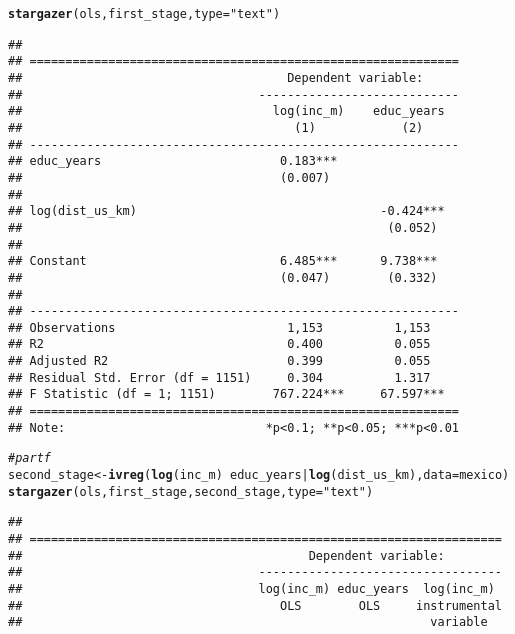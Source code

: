 \documentclass{article}\usepackage[]{graphicx}\usepackage[]{xcolor}
\makeatletter
\newcommand{\hlstr}[1]{\textcolor[rgb]{0.192,0.494,0.8}{#1}}%
\newcommand{\hlcom}[1]{\textcolor[rgb]{0.678,0.584,0.686}{\textit{#1}}}%
\newcommand{\hlopt}[1]{\textcolor[rgb]{0,0,0}{#1}}%
\newcommand{\hlstd}[1]{\textcolor[rgb]{0.345,0.345,0.345}{#1}}%
\newcommand{\hlkwb}[1]{\textcolor[rgb]{0.69,0.353,0.396}{#1}}%
\newcommand{\hlkwc}[1]{\textcolor[rgb]{0.333,0.667,0.333}{#1}}%
\newcommand{\hlkwd}[1]{\textcolor[rgb]{0.737,0.353,0.396}{\textbf{#1}}}%
\newenvironment{kframe}{%
 \def\at@end@of@kframe{}%
 \ifinner\ifhmode%
  \def\at@end@of@kframe{\end{minipage}}%
  \begin{minipage}{\columnwidth}%
 \fi\fi%
 \def\FrameCommand##1{\hskip\@totalleftmargin \hskip-\fboxsep
 \colorbox{shadecolor}{##1}\hskip-\fboxsep
     \hskip-\linewidth \hskip-\@totalleftmargin \hskip\columnwidth}%
 \MakeFramed {\advance\hsize-\width
   \@totalleftmargin\z@ \linewidth\hsize
   \@setminipage}}%
 {\par\unskip\endMakeFramed%
 \at@end@of@kframe}
\newenvironment{knitrout}{}{} %
\makeatother
\begin{document}
\begin{knitrout}
\begin{kframe}
\begin{alltt}
    \hlkwd{stargazer}\hlstd{(ols, first_stage,} \hlkwc{type} \hlstd{=} \hlstr{"text"}\hlstd{)}
\end{alltt}
\begin{verbatim}
## 
## ============================================================
##                                     Dependent variable:     
##                                 ----------------------------
##                                   log(inc_m)    educ_years  
##                                      (1)            (2)     
## ------------------------------------------------------------
## educ_years                         0.183***                 
##                                    (0.007)                  
##                                                             
## log(dist_us_km)                                  -0.424***  
##                                                   (0.052)   
##                                                             
## Constant                           6.485***      9.738***   
##                                    (0.047)        (0.332)   
##                                                             
## ------------------------------------------------------------
## Observations                        1,153          1,153    
## R2                                  0.400          0.055    
## Adjusted R2                         0.399          0.055    
## Residual Std. Error (df = 1151)     0.304          1.317    
## F Statistic (df = 1; 1151)        767.224***     67.597***  
## ============================================================
## Note:                            *p<0.1; **p<0.05; ***p<0.01
\end{verbatim}
\begin{alltt}
    \hlcom{# part f}
    \hlstd{second_stage} \hlkwb{<-} \hlkwd{ivreg}\hlstd{(}\hlkwd{log}\hlstd{(inc_m)} \hlopt{~} \hlstd{educ_years} \hlopt{|} \hlkwd{log}\hlstd{(dist_us_km),} \hlkwc{data} \hlstd{= mexico)}
    \hlkwd{stargazer}\hlstd{(ols, first_stage, second_stage,} \hlkwc{type} \hlstd{=} \hlstr{"text"}\hlstd{)}
\end{alltt}
\begin{verbatim}
## 
## ==================================================================
##                                        Dependent variable:        
##                                 ----------------------------------
##                                 log(inc_m) educ_years  log(inc_m) 
##                                    OLS        OLS     instrumental
##                                                         variable  

\end{verbatim}
\end{kframe}
\end{knitrout}
\end{document}
